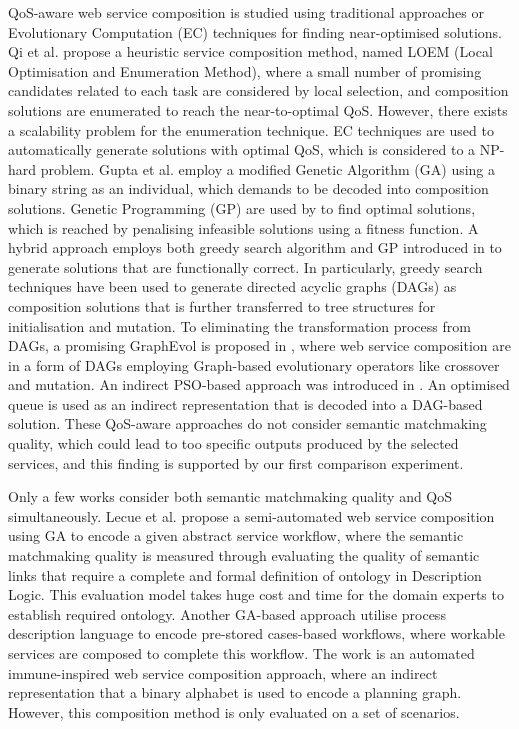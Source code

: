 \documentclass{llncs}
\begin{document}
QoS-aware web service composition is studied using traditional approaches or Evolutionary Computation (EC) techniques for finding near-optimised solutions. Qi et al. \cite{qi2010combining} propose a heuristic service composition method, named LOEM (Local Optimisation and Enumeration Method), where a small number of promising candidates related to each task are considered by local selection, and composition solutions are enumerated to reach the near-to-optimal QoS. However, there exists a scalability problem for the enumeration technique. EC techniques are used to automatically generate solutions with optimal QoS, which is considered to a NP-hard problem. Gupta et al. \cite{gupta2015optimization} employ a modified Genetic Algorithm (GA) using a binary string as an individual, which demands to be decoded into composition solutions. Genetic Programming (GP) are used by \cite{yu2013adaptive} to find optimal solutions, which is reached by penalising infeasible solutions using a fitness function. A hybrid approach employs both greedy search algorithm and GP introduced in \cite{ma2015hybrid} to generate solutions that are functionally correct. In particularly, greedy search techniques have been used to generate directed acyclic graphs (DAGs) as composition solutions that is further transferred to tree structures for initialisation and mutation. To eliminating the transformation process from DAGs, a promising GraphEvol is proposed in \cite{da2015graphevol}, where web service composition are in a form of DAGs employing Graph-based evolutionary operators like crossover and mutation. An indirect PSO-based approach was introduced in \cite{da2016particle}. An optimised queue is used as an indirect representation that is decoded into a DAG-based solution. These QoS-aware approaches \cite{gupta2015optimization,qi2010combining,ma2015hybrid,da2016particle,da2015graphevol,yu2013adaptive} do not consider semantic matchmaking quality, which could lead to too specific outputs produced by the selected services, and this finding is supported by our first comparison experiment.

Only a few works \cite{fanjiang2014semantic,lecue2009optimizing,pop2009immune} consider both semantic matchmaking quality and QoS simultaneously. Lecue et al. \cite{lecue2009optimizing} propose a semi-automated web service composition using GA to encode a given abstract service workflow, where the semantic matchmaking quality is measured through evaluating the quality of semantic links that require a complete and formal definition of ontology in Description Logic. This evaluation model takes huge cost and time for the domain experts to establish required ontology. Another GA-based approach \cite{fanjiang2014semantic} utilise process description language to encode pre-stored cases-based workflows, where workable services are composed to complete this workflow. The work \cite{pop2009immune} is an automated immune-inspired web service composition approach, where an indirect representation that a binary alphabet is used to encode a planning graph. However, this composition method is only evaluated on a set of scenarios.
\end{document}
